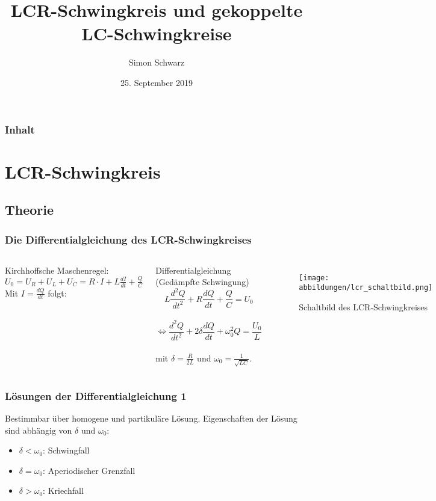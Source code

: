 \documentclass{beamer}
\title[Elektrizitätslehre]{LCR-Schwingkreis und gekoppelte LC-Schwingkreise}
\author{Simon Schwarz}
\institute{Grundpraktikum Physik Teil I}
\date{25. September 2019}
\begin{document}
\begin{frame}
\titlepage
\end{frame}

\begin{frame}
\frametitle{Inhalt}
\tableofcontents
\end{frame}


\section{LCR-Schwingkreis}
\subsection{Theorie}

\begin{frame}
\frametitle{Die Differentialgleichung des LCR-Schwingkreises}

\begin{columns}[c]

Kirchhoffsche Maschenregel: $U_0 = U_R + U_L + U_C = R\cdot I + L\frac{dI}{dt} + \frac{Q}{C}$ \\
Mit $I = \frac{dQ}{dt}$ folgt:
\begin{block}{Differentialgleichung (Gedämpfte Schwingung)}
$$L\frac{d^2Q}{dt^2} + R \frac{dQ}{dt} + \frac{Q}{C} = U_0$$ \\
$$\Leftrightarrow \frac{d^2Q}{dt^2} + 2\delta \frac{dQ}{dt} + \omega_0^2Q = \frac{U_0}{L}$$ \\
mit $\delta = \frac{R}{2L}$ und $\omega_0 = \frac{1}{\sqrt{LC}}$.
\end{block}

\begin{figure}
\texttt{[image: abbildungen/lcr\_schaltbild.png]}
\caption{Schaltbild des LCR-Schwingkreises}
\end{figure}
\end{columns}

\end{frame}


\begin{frame}
\frametitle{Lösungen der Differentialgleichung 1}
Bestimmbar über homogene und partikuläre Lösung.
Eigenschaften der Lösung sind abhängig von $\delta$ und $\omega_0$:
\begin{itemize}
\item $\delta < \omega_0$: Schwingfall
\item $\delta = \omega_0$: Aperiodischer Grenzfall
\item $\delta > \omega_0$: Kriechfall
\end{itemize}
\end{frame}
\end{document}
